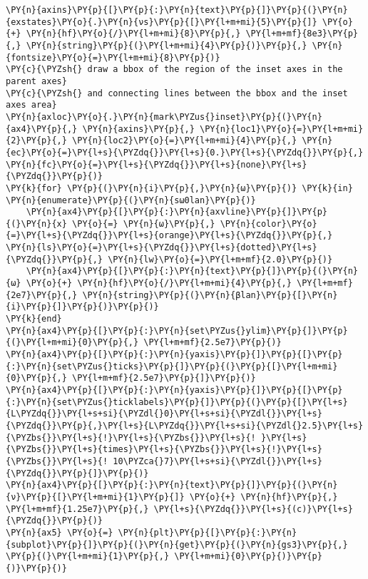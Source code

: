 \begin{Verbatim}[commandchars=\\\{\}]
\PY{n}{axins}\PY{p}{[}\PY{p}{:}\PY{n}{text}\PY{p}{]}\PY{p}{(}\PY{n}{exstates}\PY{o}{.}\PY{n}{νs}\PY{p}{[}\PY{l+m+mi}{5}\PY{p}{]} \PY{o}{+} \PY{n}{hf}\PY{o}{/}\PY{l+m+mi}{8}\PY{p}{,} \PY{l+m+mf}{8e3}\PY{p}{,} \PY{n}{string}\PY{p}{(}\PY{l+m+mi}{4}\PY{p}{)}\PY{p}{,} \PY{n}{fontsize}\PY{o}{=}\PY{l+m+mi}{8}\PY{p}{)}
\PY{c}{\PYZsh{} draw a bbox of the region of the inset axes in the parent axes}
\PY{c}{\PYZsh{} and connecting lines between the bbox and the inset axes area}
\PY{n}{axloc}\PY{o}{.}\PY{n}{mark\PYZus{}inset}\PY{p}{(}\PY{n}{ax4}\PY{p}{,} \PY{n}{axins}\PY{p}{,} \PY{n}{loc1}\PY{o}{=}\PY{l+m+mi}{2}\PY{p}{,} \PY{n}{loc2}\PY{o}{=}\PY{l+m+mi}{4}\PY{p}{,} \PY{n}{ec}\PY{o}{=}\PY{l+s}{\PYZdq{}}\PY{l+s}{0.}\PY{l+s}{\PYZdq{}}\PY{p}{,} \PY{n}{fc}\PY{o}{=}\PY{l+s}{\PYZdq{}}\PY{l+s}{none}\PY{l+s}{\PYZdq{}}\PY{p}{)}
\PY{k}{for} \PY{p}{(}\PY{n}{i}\PY{p}{,}\PY{n}{ω}\PY{p}{)} \PY{k}{in} \PY{n}{enumerate}\PY{p}{(}\PY{n}{sω0lan}\PY{p}{)}
    \PY{n}{ax4}\PY{p}{[}\PY{p}{:}\PY{n}{axvline}\PY{p}{]}\PY{p}{(}\PY{n}{x} \PY{o}{=} \PY{n}{ω}\PY{p}{,} \PY{n}{color}\PY{o}{=}\PY{l+s}{\PYZdq{}}\PY{l+s}{orange}\PY{l+s}{\PYZdq{}}\PY{p}{,} \PY{n}{ls}\PY{o}{=}\PY{l+s}{\PYZdq{}}\PY{l+s}{dotted}\PY{l+s}{\PYZdq{}}\PY{p}{,} \PY{n}{lw}\PY{o}{=}\PY{l+m+mf}{2.0}\PY{p}{)}
    \PY{n}{ax4}\PY{p}{[}\PY{p}{:}\PY{n}{text}\PY{p}{]}\PY{p}{(}\PY{n}{ω} \PY{o}{+} \PY{n}{hf}\PY{o}{/}\PY{l+m+mi}{4}\PY{p}{,} \PY{l+m+mf}{2e7}\PY{p}{,} \PY{n}{string}\PY{p}{(}\PY{n}{βlan}\PY{p}{[}\PY{n}{i}\PY{p}{]}\PY{p}{)}\PY{p}{)}
\PY{k}{end}
\PY{n}{ax4}\PY{p}{[}\PY{p}{:}\PY{n}{set\PYZus{}ylim}\PY{p}{]}\PY{p}{(}\PY{l+m+mi}{0}\PY{p}{,} \PY{l+m+mf}{2.5e7}\PY{p}{)}
\PY{n}{ax4}\PY{p}{[}\PY{p}{:}\PY{n}{yaxis}\PY{p}{]}\PY{p}{[}\PY{p}{:}\PY{n}{set\PYZus{}ticks}\PY{p}{]}\PY{p}{(}\PY{p}{[}\PY{l+m+mi}{0}\PY{p}{,} \PY{l+m+mf}{2.5e7}\PY{p}{]}\PY{p}{)}
\PY{n}{ax4}\PY{p}{[}\PY{p}{:}\PY{n}{yaxis}\PY{p}{]}\PY{p}{[}\PY{p}{:}\PY{n}{set\PYZus{}ticklabels}\PY{p}{]}\PY{p}{(}\PY{p}{[}\PY{l+s}{L\PYZdq{}}\PY{l+s+si}{\PYZdl{}0}\PY{l+s+si}{\PYZdl{}}\PY{l+s}{\PYZdq{}}\PY{p}{,}\PY{l+s}{L\PYZdq{}}\PY{l+s+si}{\PYZdl{}2.5}\PY{l+s}{\PYZbs{}}\PY{l+s}{!}\PY{l+s}{\PYZbs{}}\PY{l+s}{! }\PY{l+s}{\PYZbs{}}\PY{l+s}{times}\PY{l+s}{\PYZbs{}}\PY{l+s}{!}\PY{l+s}{\PYZbs{}}\PY{l+s}{! 10\PYZca{}7}\PY{l+s+si}{\PYZdl{}}\PY{l+s}{\PYZdq{}}\PY{p}{]}\PY{p}{)}
\PY{n}{ax4}\PY{p}{[}\PY{p}{:}\PY{n}{text}\PY{p}{]}\PY{p}{(}\PY{n}{ν}\PY{p}{[}\PY{l+m+mi}{1}\PY{p}{]} \PY{o}{+} \PY{n}{hf}\PY{p}{,} \PY{l+m+mf}{1.25e7}\PY{p}{,} \PY{l+s}{\PYZdq{}}\PY{l+s}{(c)}\PY{l+s}{\PYZdq{}}\PY{p}{)}
\PY{n}{ax5} \PY{o}{=} \PY{n}{plt}\PY{p}{[}\PY{p}{:}\PY{n}{subplot}\PY{p}{]}\PY{p}{(}\PY{n}{get}\PY{p}{(}\PY{n}{gs3}\PY{p}{,} \PY{p}{(}\PY{l+m+mi}{1}\PY{p}{,} \PY{l+m+mi}{0}\PY{p}{)}\PY{p}{)}\PY{p}{)}

\end{Verbatim}
